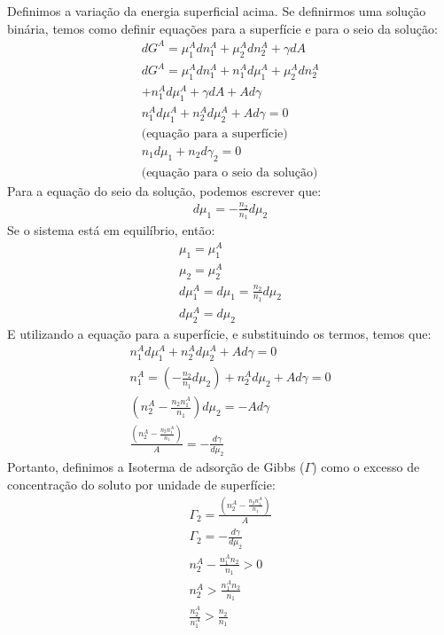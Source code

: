   \begin{definition}
    Definimos a variação da energia superficial acima. Se definirmos uma solução binária, temos como definir equações para a superfície e para o seio da solução:
    \begin{gather}
      dG^A = \mu_1^A dn_1^A + \mu_2^A dn_2^A + \gamma dA \\
      dG^A = \mu_1^A dn_1^A + n_1^A d\mu_1^A + \mu_2^A dn_2^A \\ + n_1^A d \mu_1^A + \gamma dA + A d \gamma \\
      n_1^A d \mu_1^A + n_2^A d \mu_2^A + A d\gamma = 0 \\
      \text{(equação para a superfície)} \\
      n_1 d\mu_1 + n_2 d \gamma_2 = 0 \\
      \text{(equação para o seio da solução)}
    \end{gather}
    Para a equação do seio da solução, podemos escrever que:
    \begin{gather}
      d\mu_1 = - \frac{n_2}{n_1} d\mu_2
    \end{gather}
    Se o sistema está em equilíbrio, então:
    \begin{gather}
      \mu_1 = \mu_1^A \\
      \mu_2 = \mu_2^A \\
      d\mu_1^A = d \mu_1 = \frac{n_2}{n_1} d \mu_2 \\
      d\mu_2^A = d\mu_2
    \end{gather}
    E utilizando a equação para a superfície, e substituindo os termos, temos que:
    \begin{gather}
      n_1^A d \mu_1^A + n_2^A d \mu_2^A + A d\gamma = 0 \\
      n_1^A = \left( - \frac{n_2}{n_1} d\mu_2 \right) + n_2^A d \mu_2 + A d \gamma = 0 \\
      \left( n_2^A - \frac{n_2 n_1^A}{n_1} \right) d \mu_2 = - A d \gamma \\
      \frac{\left( n_2^A - \frac{n_2 n_1^A}{n_1} \right)}{A} = - \frac{d \gamma}{d \mu_2}
    \end{gather}
    Portanto, definimos a Isoterma de adsorção de Gibbs ($\Gamma$) como o excesso de concentração do soluto por unidade de superfície:
    \begin{gather}
      \Gamma_2 = \frac{\left( n_2^A - \frac{n_2 n_1^A}{n_1} \right)}{A} \\
      \Gamma_2 = - \frac{d\gamma}{d\mu_2} \\
      n_2^A - \frac{n_1^An_2}{n_1} > 0 \\
      n_2^A > \frac{n_1^A n_2}{n_1} \\
      \frac{n_2^A}{n_1^A} > \frac{n_2}{n_1}
    \end{gather}
  \end{definition}

